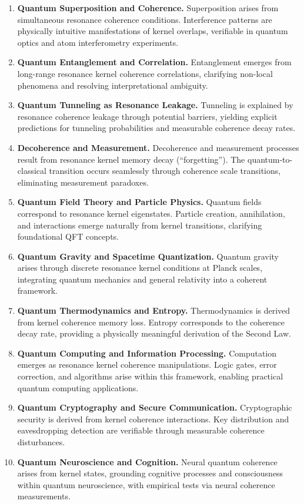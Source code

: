 \begin{enumerate}
  \item \textbf{Quantum Superposition and Coherence.}  
    Superposition arises from simultaneous resonance coherence conditions. Interference patterns are physically intuitive manifestations of kernel overlaps, verifiable in quantum optics and atom interferometry experiments.

  \item \textbf{Quantum Entanglement and Correlation.}  
    Entanglement emerges from long-range resonance kernel coherence correlations, clarifying non-local phenomena and resolving interpretational ambiguity.

  \item \textbf{Quantum Tunneling as Resonance Leakage.}  
    Tunneling is explained by resonance coherence leakage through potential barriers, yielding explicit predictions for tunneling probabilities and measurable coherence decay rates.

  \item \textbf{Decoherence and Measurement.}  
    Decoherence and measurement processes result from resonance kernel memory decay (“forgetting”). The quantum-to-classical transition occurs seamlessly through coherence scale transitions, eliminating measurement paradoxes.

  \item \textbf{Quantum Field Theory and Particle Physics.}  
    Quantum fields correspond to resonance kernel eigenstates. Particle creation, annihilation, and interactions emerge naturally from kernel transitions, clarifying foundational QFT concepts.

  \item \textbf{Quantum Gravity and Spacetime Quantization.}  
    Quantum gravity arises through discrete resonance kernel conditions at Planck scales, integrating quantum mechanics and general relativity into a coherent framework.

  \item \textbf{Quantum Thermodynamics and Entropy.}  
    Thermodynamics is derived from kernel coherence memory loss. Entropy corresponds to the coherence decay rate, providing a physically meaningful derivation of the Second Law.

  \item \textbf{Quantum Computing and Information Processing.}  
    Computation emerges as resonance kernel coherence manipulations. Logic gates, error correction, and algorithms arise within this framework, enabling practical quantum computing applications.

  \item \textbf{Quantum Cryptography and Secure Communication.}  
    Cryptographic security is derived from kernel coherence interactions. Key distribution and eavesdropping detection are verifiable through measurable coherence disturbances.

  \item \textbf{Quantum Neuroscience and Cognition.}  
    Neural quantum coherence arises from kernel states, grounding cognitive processes and consciousness within quantum neuroscience, with empirical tests via neural coherence measurements.
\end{enumerate}

